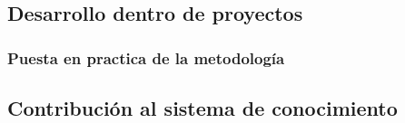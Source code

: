 \subsection{Desarrollo dentro de proyectos}
\subsubsection{Puesta en practica de la metodología}
\subsection{Contribución al sistema de conocimiento}

\pagebreak
